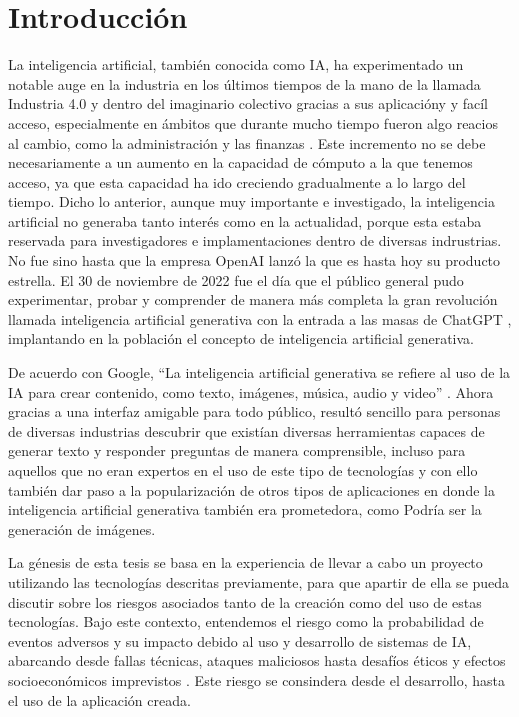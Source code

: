 
\chapter{Introducción}
La inteligencia artificial, también conocida como IA, ha experimentado un notable auge en la industria en los últimos tiempos
de la mano de la llamada Industria 4.0 \cite{intro1} y dentro del imaginario colectivo gracias a sus aplicacióny y facíl acceso, 
especialmente en ámbitos que durante mucho tiempo fueron algo reacios al cambio, como la administración y las finanzas \cite{intro2}. 
Este incremento no se debe necesariamente a un aumento en la capacidad de cómputo a la que tenemos acceso, 
ya que esta capacidad ha ido creciendo gradualmente a lo largo del tiempo. Dicho lo anterior, aunque muy importante e investigado, 
la inteligencia artificial no generaba tanto interés como en la actualidad, porque esta estaba reservada para investigadores e implamentaciones dentro de diversas indrustrias.
No fue sino hasta que la empresa OpenAI lanzó la que es hasta hoy su producto estrella. El 30 de noviembre de 2022 fue  el día que el público general 
pudo experimentar, probar y comprender de manera más completa la gran revolución llamada inteligencia artificial generativa con la entrada a las masas de ChatGPT \cite{intro3},
implantando en la población el concepto de inteligencia artificial generativa.

De acuerdo con Google, ``La inteligencia artificial generativa se refiere al uso de la IA para crear contenido, como texto, imágenes, 
música, audio y video'' \cite{google1}. Ahora gracias a una interfaz amigable para todo público, resultó sencillo para personas de diversas industrias descubrir que existían 
diversas herramientas capaces de generar texto y responder preguntas de manera comprensible, incluso para aquellos que no eran expertos 
en el uso de este tipo de tecnologías y con ello también dar paso a la popularización de otros tipos de aplicaciones en donde 
la inteligencia artificial generativa también era prometedora, como Podría ser la generación de imágenes.

La génesis de esta tesis se basa en la experiencia de llevar a cabo un proyecto utilizando las tecnologías descritas previamente,
para que apartir de ella se pueda discutir sobre los riesgos asociados tanto de la creación como del uso de estas tecnologías. 
Bajo este contexto, entendemos el riesgo como la probabilidad de eventos adversos y su impacto debido al uso y desarrollo de sistemas de IA, 
abarcando desde fallas técnicas, ataques maliciosos hasta desafíos éticos y efectos socioeconómicos imprevistos \cite{intro1}. Este 
riesgo se consindera desde el desarrollo, hasta el uso de la aplicación creada.

